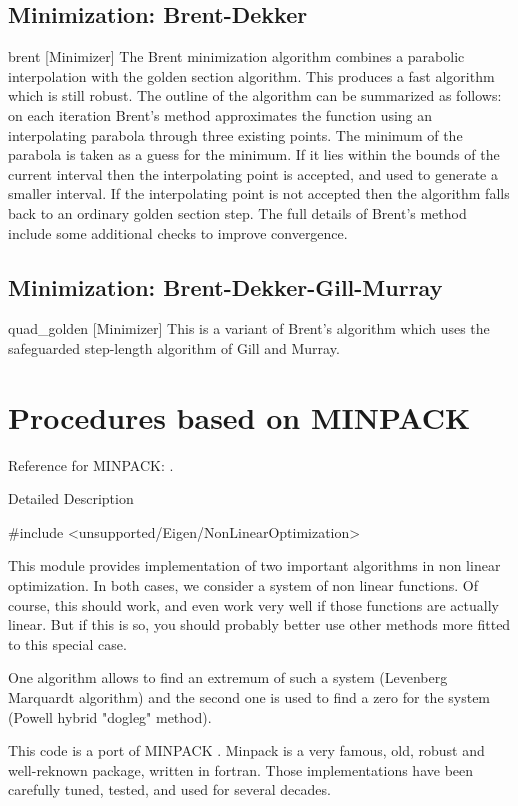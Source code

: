 \subsection{Minimization: Brent-Dekker}
brent [Minimizer]
The Brent minimization algorithm combines a parabolic interpolation with the golden
section algorithm. This produces a fast algorithm which is still robust.
The outline of the algorithm can be summarized as follows: on each iteration Brent’s
method approximates the function using an interpolating parabola through three
existing points. The minimum of the parabola is taken as a guess for the minimum.
If it lies within the bounds of the current interval then the interpolating point is
accepted, and used to generate a smaller interval. If the interpolating point is not
accepted then the algorithm falls back to an ordinary golden section step. The full
details of Brent’s method include some additional checks to improve convergence.

\subsection{Minimization: Brent-Dekker-Gill-Murray}
quad\_golden [Minimizer]
This is a variant of Brent’s algorithm which uses the safeguarded step-length algorithm
of Gill and Murray.



\section{Procedures based on MINPACK}


Reference for  MINPACK: \cite{More_1980}.

Detailed Description

\#include <unsupported/Eigen/NonLinearOptimization>

This module provides implementation of two important algorithms in non linear optimization. In both cases, we consider a system of non linear functions. Of course, this should work, and even work very well if those functions are actually linear. But if this is so, you should probably better use other methods more fitted to this special case.

One algorithm allows to find an extremum of such a system (Levenberg Marquardt algorithm) and the second one is used to find a zero for the system (Powell hybrid "dogleg" method).

This code is a port of MINPACK . Minpack is a very famous, old, robust and well-reknown package, written in fortran. Those implementations have been carefully tuned, tested, and used for several decades.

